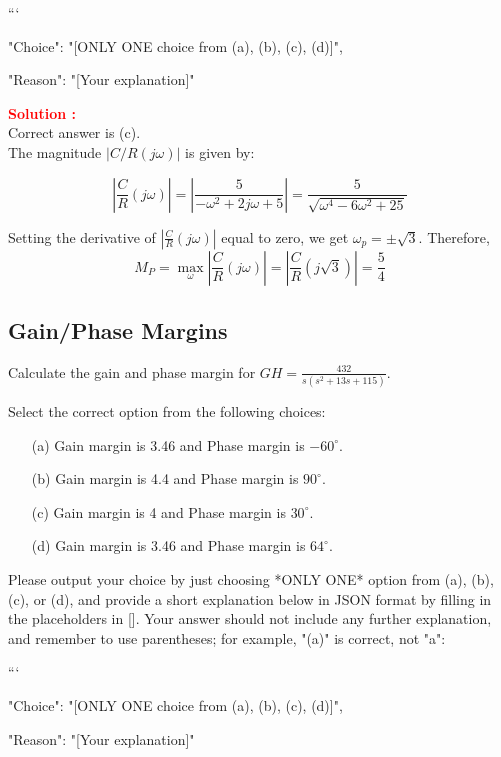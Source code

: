\documentclass[12pt]{article}
\begin{document}
```
{

"Choice": "[ONLY ONE choice from (a), (b), (c), (d)]",

"Reason": "[Your explanation]"

}


\textbf{\textcolor{red}{Solution :}} \\
Correct answer is (c).\\
The magnitude \(|C/R(j\omega)|\) is given by:

\[
\left| \frac{C}{R}(j\omega) \right| = \left| \frac{5}{- \omega^2 + 2j\omega + 5} \right| = \frac{5}{\sqrt{\omega^4 - 6\omega^2 + 25}}
\]

Setting the derivative of \(\left| \frac{C}{R}(j\omega) \right|\) equal to zero, we get \(\omega_p = \pm \sqrt{3}\). Therefore,
\begin{equation}
    M_P = \max_\omega \left| \frac{C}{R}(j\omega) \right| = \left| \frac{C}{R}(j\sqrt{3}) \right| = \frac{5}{4}
\end{equation}
\clearpage

\subsection{Gain/Phase Margins}

Calculate the gain and phase margin for \(GH = \frac{432}{s(s^2 + 13s + 115)}\).


Select the correct option from the following choices:
\begin{enumerate}
    \item [(a)] Gain margin is 3.46 and Phase margin is $-60^\circ$. 
    \item [(b)] Gain margin is 4.4 and Phase margin is $90^\circ$.
    \item [(c)] Gain margin is 4 and Phase margin is $30^\circ$. 
    \item [(d)] Gain margin is 3.46 and Phase margin is $64^\circ$.
\end{enumerate}

Please output your choice by just choosing *ONLY ONE* option from (a), (b), (c), or (d), and provide a short explanation below in JSON format by filling in the placeholders in []. Your answer should not include any further explanation, and remember to use parentheses; for example, "(a)" is correct, not "a": 

```
{

"Choice": "[ONLY ONE choice from (a), (b), (c), (d)]",

"Reason": "[Your explanation]"

}
\end{document}
